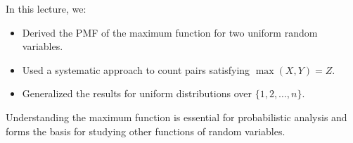 \documentclass{article}
\begin{document}
In this lecture, we:
\begin{itemize}
  \item Derived the PMF of the maximum function for two uniform random variables.
  \item Used a systematic approach to count pairs satisfying $\max(X, Y) = Z$.
  \item Generalized the results for uniform distributions over $\{1, 2, \dots, n\}$.
\end{itemize}

Understanding the maximum function is essential for probabilistic analysis and forms the basis for studying other functions of random variables.
\end{document}
